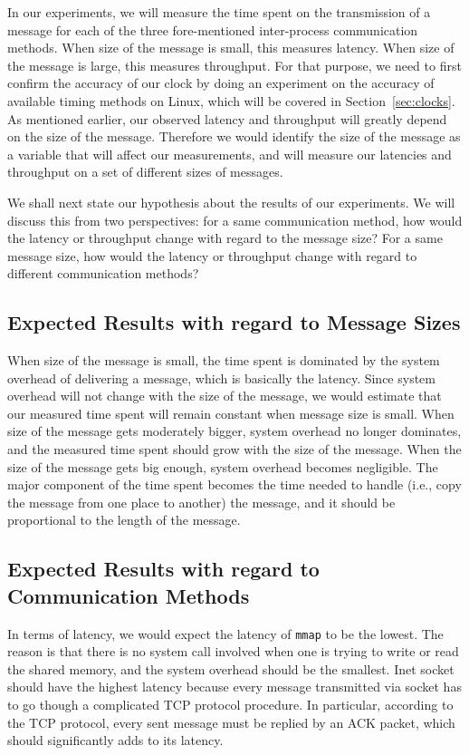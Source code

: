\documentclass{article}
\begin{document}
In our experiments, we will measure the time spent on the transmission of a message for each of the three fore-mentioned inter-process communication methods.
When size of the message is small, this measures latency.
When size of the message is large, this measures throughput.
For that purpose, we need to first confirm the accuracy of our clock by doing an experiment on the accuracy of available timing methods on Linux, which will be covered in Section~\ref{sec:clocks}.
As mentioned earlier, our observed latency and throughput will greatly depend on the size of the message.
Therefore we would identify the size of the message as a variable that will affect our measurements, and will measure our latencies and throughput on a set of different sizes of messages.

We shall next state our hypothesis about the results of our experiments.
We will discuss this from two perspectives: for a same communication method, how would the latency or throughput change with regard to the message size?
For a same message size, how would the latency or throughput change with regard to different communication methods?

\subsection{Expected Results with regard to Message Sizes}
When size of the message is small, the time spent is dominated by the system overhead of delivering a message, which is basically the latency.
Since system overhead will not change with the size of the message, we would estimate that our measured time spent will remain constant when message size is small.
When size of the message gets moderately bigger, system overhead no longer dominates, and the measured time spent should grow with the size of the message.
When the size of the message gets big enough, system overhead becomes negligible.
The major component of the time spent becomes the time needed to handle (i.e., copy the message from one place to another) the message, and it should be proportional to the length of the message.

\subsection{Expected Results with regard to Communication Methods}
In terms of latency, we would expect the latency of \texttt{mmap} to be the lowest.
The reason is that there is no system call involved when one is trying to write or read the shared memory, and the system overhead should be the smallest.
Inet socket should have the highest latency because every message transmitted via socket has to go though a complicated TCP protocol procedure.
In particular, according to the TCP protocol, every sent message must be replied by an ACK packet, which should significantly adds to its latency.
\end{document}
